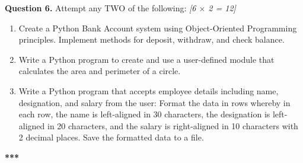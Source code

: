 \documentclass[11pt,a4paper]{article}
\newcommand{\pts}[1]{\hfill \textit{[#1]}}
\begin{document}
\bigskip

\noindent \textbf{Question 6.} Attempt any TWO of the following: \pts{6 $\times$ 2 = 12}
\begin{enumerate}[label=\alph*.]
  \item Create a Python Bank Account system using Object-Oriented Programming principles. Implement methods for deposit, withdraw, and check balance.
  \item Write a Python program to create and use a user-defined module that calculates the area and perimeter of a circle.
  \item Write a Python program that accepts employee details including name, designation, and salary from the user: Format the data in rows whereby in each row, the name is left-aligned in 30 characters, the designation is left-aligned in 20 characters, and the salary is right-aligned in 10 characters with 2 decimal places. Save the formatted data to a file.
\end{enumerate}

\bigskip
\begin{center}
  \textbf{***}
\end{center}
\end{document}

